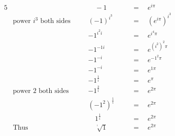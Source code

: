 \begin{alignat*}{5}
&\,&&\quad-1\quad&&\,=\quad e^{i\pi}\\
&\text{power }i^3\text{ both sides}\quad&&\left(-1\right)^{i^3}\quad&&\,=\quad(e^{i\pi})^{i^3}\\
&\,&&-1^{i^2i}\quad&&\,=\quad e^{i^4\pi}\\
&\,&&-1^{-1i}\quad&&\,=\quad e^{(i^2)^2\pi}\\
&\,&&-1^{-i}\quad&&\,=\quad e^{-1^2\pi}\\
&\,&&-1^{-i}&&\,=\quad e^{1\pi}\\
&\,&&-1^\frac{1}{i}&&\,=\quad e^\pi\\
&\text{power }2\text{ both sides}&&-1^\frac{2}{i}&&\,=\quad e^{2\pi}\\
&\,&&\left(-1^2\right)^\frac{1}{i}&&\,=\quad e^{2\pi}\\
&\,&&\quad1^{\frac{1}{i}}&&\,=\quad e^{2\pi}\\
&\text{Thus}&&\quad\sqrt[^i]{1}&&\,=\quad e^{2\pi}
\end{alignat*}
